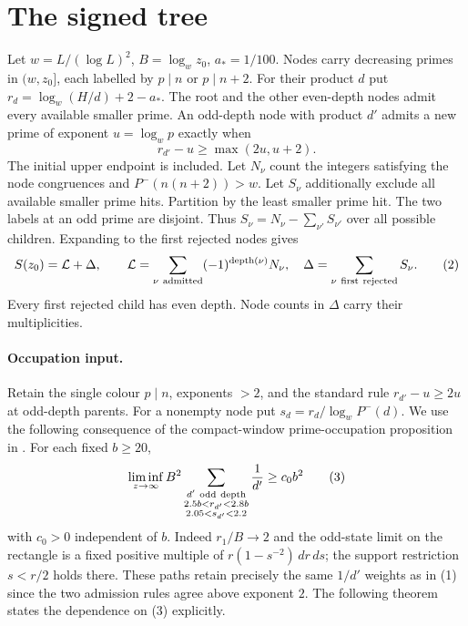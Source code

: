 \documentclass[11pt]{article}
\begin{document}
\section{The signed tree}
Let $w=L/(\log L)^2$, $B=\log_w z_0$, $a_*=1/100$. Nodes carry decreasing primes in $(w,z_0]$, each labelled by $p\mid n$ or $p\mid n+2$. For their product $d$ put $r_d=\log_w(H/d)+2-a_*$. The root and the other even-depth nodes admit every available smaller prime. An odd-depth node with product $d'$ admits a new prime of exponent $u=\log_w p$ exactly when
\[
                     r_{d'}-u\ge\max(2u,u+2).                 \tag{1}
\]
The initial upper endpoint is included. Let $N_\nu$ count the integers satisfying the node congruences and $P^-(n(n+2))>w$. Let $S_\nu$ additionally exclude all available smaller prime hits. Partition by the least smaller prime hit. The two labels at an odd prime are disjoint. Thus $S_\nu=N_\nu-\sum_{\nu'} S_{\nu'}$ over all possible children. Expanding to the first rejected nodes gives
\[
             S(z_0)=\mathcal L+\Delta,\qquad
 \mathcal L=\sum_{\nu\ {\rm admitted}}(-1)^{\mathrm{depth}(\nu)}N_\nu,
 \quad\Delta=\sum_{\nu\ {\rm first\ rejected}}S_\nu.           \tag{2}
\]
Every first rejected child has even depth. Node counts in $\Delta$ carry their multiplicities.

\paragraph{Occupation input.} Retain the single colour $p\mid n$, exponents $>2$, and the standard rule $r_{d'}-u\ge2u$ at odd-depth parents. For a nonempty node put $s_d=r_d/\log_w P^-(d)$. We use the following consequence of the compact-window prime-occupation proposition in \cite[\S5, Proposition 5.5(iv)]{OAI}. For each fixed $b\ge20$,
\[
 \liminf_{z\to\infty}B^2
 \sum_{\substack{d'\ {\rm odd\ depth}\\2.5b<r_{d'}<2.8b\\2.05<s_{d'}<2.2}}
 \frac1{d'}\ge c_0 b^2                                      \tag{3}
\]
with $c_0>0$ independent of $b$. Indeed $r_1/B\to2$ and the odd-state limit on the rectangle is a fixed positive multiple of $r(1-s^{-2})\,dr\,ds$; the support restriction $s<r/2$ holds there. These paths retain precisely the same $1/d'$ weights as in (1) since the two admission rules agree above exponent $2$. The following theorem states the dependence on (3) explicitly.
\end{document}

